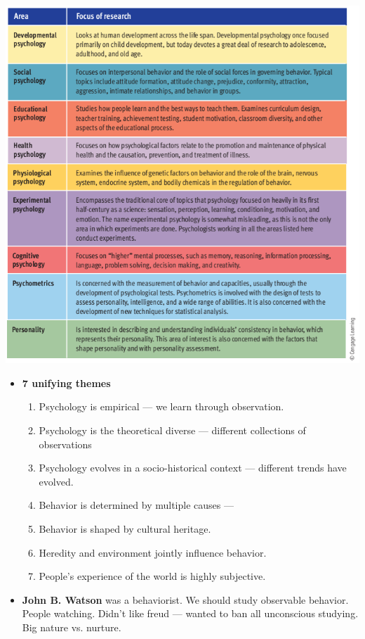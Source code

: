 \documentclass{article}
\begin{document}
\begin{center}
    \includegraphics{areas.png}
\end{center}

\begin{itemize}
    \item \textbf{7 unifying themes}
    \begin{enumerate}
        \item Psychology is empirical --- we learn through observation.
        \item Psychology is the theoretical diverse --- different collections of observations
        \item Psychology evolves in a socio-historical context --- different trends have evolved.
        \item Behavior is determined by multiple causes ---
        \item Behavior is shaped by cultural heritage.
        \item Heredity and environment jointly influence behavior.
        \item People's experience of the world is highly subjective.
    \end{enumerate}

    \item \textbf{John B. Watson} was a behaviorist. We should study observable behavior. People watching. Didn't like freud --- wanted to ban all unconscious studying. Big nature vs. nurture.
\end{itemize}
\end{document}
